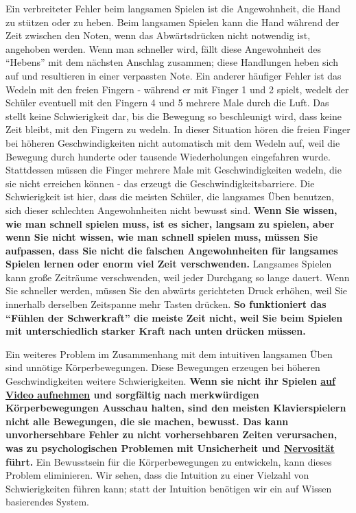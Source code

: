 Ein verbreiteter Fehler beim langsamen Spielen ist die Angewohnheit, die Hand zu stützen oder zu heben.
Beim langsamen Spielen kann die Hand während der Zeit zwischen den Noten, wenn das Abwärtsdrücken nicht notwendig ist, angehoben werden.
Wenn man schneller wird, fällt diese Angewohnheit des \enquote{Hebens} mit dem nächsten Anschlag zusammen; diese Handlungen heben sich auf und resultieren in einer verpassten Note.
Ein anderer häufiger Fehler ist das Wedeln mit den freien Fingern - während er mit Finger 1 und 2 spielt, wedelt der Schüler eventuell mit den Fingern 4 und 5 mehrere Male durch die Luft.
Das stellt keine Schwierigkeit dar, bis die Bewegung so beschleunigt wird, dass keine Zeit bleibt, mit den Fingern zu wedeln.
In dieser Situation hören die freien Finger bei höheren Geschwindigkeiten nicht automatisch mit dem Wedeln auf, weil die Bewegung durch hunderte oder tausende Wiederholungen eingefahren wurde.
Stattdessen müssen die Finger mehrere Male mit Geschwindigkeiten wedeln, die sie nicht erreichen können - das erzeugt die Geschwindigkeitsbarriere.
Die Schwierigkeit ist hier, dass die meisten Schüler, die langsames Üben benutzen, sich dieser schlechten Angewohnheiten nicht bewusst sind.
\textbf{Wenn Sie wissen, wie man schnell spielen muss, ist es sicher, langsam zu spielen, aber wenn Sie nicht wissen, wie man schnell spielen muss, müssen Sie aufpassen, dass Sie nicht die falschen Angewohnheiten für langsames Spielen lernen oder enorm viel Zeit verschwenden.}
Langsames Spielen kann große Zeiträume verschwenden, weil jeder Durchgang so lange dauert.
Wenn Sie schneller werden, müssen Sie den abwärts gerichteten Druck erhöhen, weil Sie innerhalb derselben Zeitspanne mehr Tasten drücken.
\textbf{So funktioniert das \enquote{Fühlen der Schwerkraft} die meiste Zeit nicht, weil Sie beim Spielen mit unterschiedlich starker Kraft nach unten drücken müssen.}

Ein weiteres Problem im Zusammenhang mit dem intuitiven langsamen Üben sind unnötige Körperbewegungen.
Diese Bewegungen erzeugen bei höheren Geschwindigkeiten weitere Schwierigkeiten.
\textbf{Wenn sie nicht ihr Spielen \hyperref[c1iii13]{auf Video aufnehmen} und sorgfältig nach merkwürdigen Körperbewegungen Ausschau halten, sind den meisten Klavierspielern nicht alle Bewegungen, die sie machen, bewusst. 
Das kann unvorhersehbare Fehler zu nicht vorhersehbaren Zeiten verursachen, was zu psychologischen Problemen mit Unsicherheit und \hyperref[c1iii15]{Nervosität} führt.}
Ein Bewusstsein für die Körperbewegungen zu entwickeln, kann dieses Problem eliminieren.
Wir sehen, dass die Intuition zu einer Vielzahl von Schwierigkeiten führen kann; statt der Intuition benötigen wir ein auf Wissen basierendes System.


